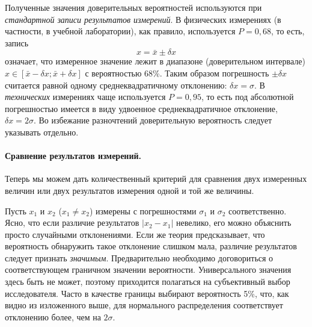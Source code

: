 
Полученные значения доверительных вероятностей используются при
\emph{стандартной записи результатов измерений}. В физических измерениях
(в частности, в учебной лаборатории), как правило, используется $P=0{,}68$,
то есть, запись
\[
x=\bar{x}\pm\delta x
\]
означает, что измеренное значение лежит в диапазоне (доверительном
интервале) $x\in\left[\bar{x}-\delta x;\bar{x}+\delta x\right]$ с
вероятностью 68\%. Таким образом погрешность $\pm\delta x$ считается
равной одному среднеквадратичному отклонению: $\delta x=\sigma$.
В \emph{технических} измерениях чаще используется $P=0{,}95$, то есть под
абсолютной погрешностью имеется в виду удвоенное среднеквадратичное
отклонение, $\delta x=2\sigma$. Во избежание разночтений доверительную
вероятность следует указывать отдельно.



\paragraph{Сравнение результатов измерений.}
Теперь мы можем дать количественный критерий для сравнения двух измеренных
величин или двух результатов измерения одной и той же величины.

Пусть $x_{1}$ и $x_{2}$ ($x_{1}\ne x_{2}$) измерены с
погрешностями $\sigma_{1}$ и $\sigma_{2}$ соответственно.
Ясно, что если различие результатов $|x_2-x_1|$ невелико,
его можно объяснить просто случайными отклонениями.
Если же теория предсказывает, что вероятность обнаружить такое отклонение
слишком мала, различие результатов следует признать \emph{значимым}.
Предварительно необходимо договориться о соответствующем граничном значении
вероятности. Универсального значения здесь быть не может,
поэтому приходится полагаться на субъективный выбор исследователя. Часто
в качестве  границы выбирают вероятность 5\%,
что, как видно из изложенного выше, для нормального распределения
соответствует отклонению более, чем на $2\sigma$.

